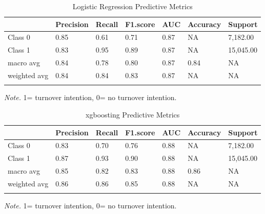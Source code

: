 \documentclass[
  man]{apa7}
\begin{document}
\begin{table}[tbp]

\begin{center}
\begin{threeparttable}

\caption{\label{tab:logitable100k}Logistic Regression Predictive Metrics}

\begin{tabular}{lllllll}
\toprule
 & \multicolumn{1}{c}{Precision} & \multicolumn{1}{c}{Recall} & \multicolumn{1}{c}{F1.score} & \multicolumn{1}{c}{AUC} & \multicolumn{1}{c}{Accuracy} & \multicolumn{1}{c}{Support}\\
\midrule
Class 0 & 0.85 & 0.61 & 0.71 & 0.87 & NA & 7,182.00\\
Class 1 & 0.83 & 0.95 & 0.89 & 0.87 & NA & 15,045.00\\
macro avg & 0.84 & 0.78 & 0.80 & 0.87 & 0.84 & NA\\
weighted avg & 0.84 & 0.84 & 0.83 & 0.87 & NA & NA\\
\bottomrule
\addlinespace
\end{tabular}

\begin{tablenotes}[para]
\normalsize{\textit{Note.} 1= turnover intention, 0= no turnover intention.}
\end{tablenotes}

\end{threeparttable}
\end{center}

\end{table}

\begin{table}[tbp]

\begin{center}
\begin{threeparttable}

\caption{\label{tab:xgbtable100k}xgboosting Predictive Metrics}

\begin{tabular}{lllllll}
\toprule
 & \multicolumn{1}{c}{Precision} & \multicolumn{1}{c}{Recall} & \multicolumn{1}{c}{F1.score} & \multicolumn{1}{c}{AUC} & \multicolumn{1}{c}{Accuracy} & \multicolumn{1}{c}{Support}\\
\midrule
Class 0 & 0.83 & 0.70 & 0.76 & 0.88 & NA & 7,182.00\\
Class 1 & 0.87 & 0.93 & 0.90 & 0.88 & NA & 15,045.00\\
macro avg & 0.85 & 0.82 & 0.83 & 0.88 & 0.86 & NA\\
weighted avg & 0.86 & 0.86 & 0.85 & 0.88 & NA & NA\\
\bottomrule
\addlinespace
\end{tabular}

\begin{tablenotes}[para]
\normalsize{\textit{Note.} 1= turnover intention, 0= no turnover intention.}
\end{tablenotes}

\end{threeparttable}
\end{center}

\end{table}
\end{document}
